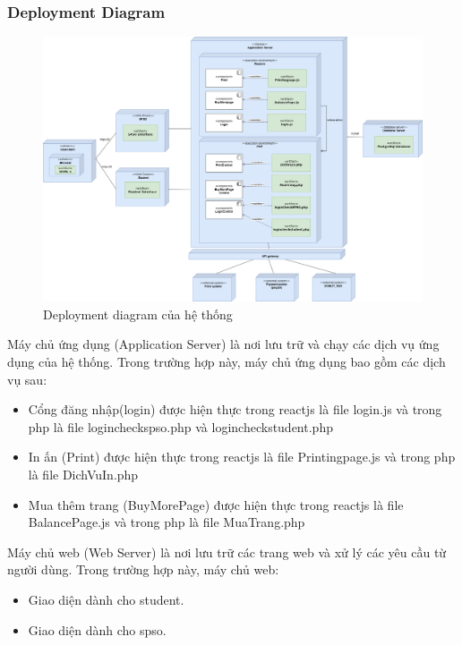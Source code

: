 \documentclass[a4paper]{article}
\begin{document}
\newpage
\subsubsection{Deployment Diagram}
\begin{figure}[h!]
\begin{center}
\includegraphics[width=16cm]{picture/deployment_diagram-Trang-2.drawio (1).png}
\caption{Deployment diagram của hệ thống}
\end{center}
\end{figure}
Máy chủ ứng dụng (Application Server) là nơi lưu trữ và chạy các dịch vụ ứng dụng của hệ thống. Trong trường hợp này, máy chủ ứng dụng bao gồm các dịch vụ sau:
\begin{itemize}
    \item Cổng đăng nhập(login) được hiện thực trong reactjs là file login.js và trong php là file logincheckspso.php và logincheckstudent.php
    \item In ấn (Print) được hiện thực trong reactjs là file Printingpage.js và trong php là file DichVuIn.php
    \item Mua thêm trang (BuyMorePage)  được hiện thực trong reactjs là file BalancePage.js và trong php là file MuaTrang.php
\end{itemize}
Máy chủ web (Web Server) là nơi lưu trữ các trang web và xử lý các yêu cầu từ người dùng. Trong trường hợp này, máy chủ web:
\begin{itemize}
    \item Giao diện dành cho student.
    \item Giao diện dành cho spso.
\end{itemize}
\end{document}

